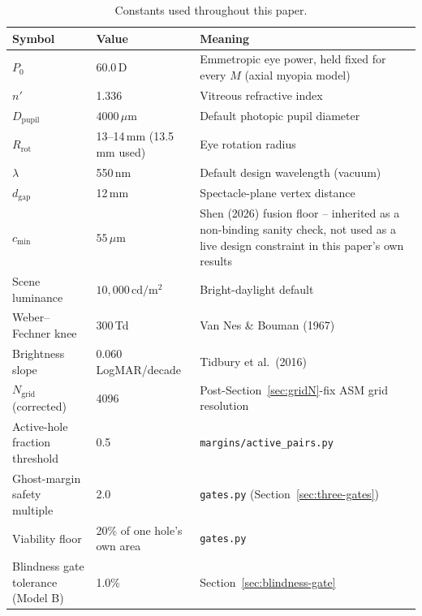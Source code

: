 \begin{longtable}{p{3.6cm}p{2.6cm}p{6.8cm}}
\caption{Constants used throughout this paper.}\\
\toprule
Symbol & Value & Meaning \\
\midrule
\endhead
$P_0$ & 60.0\,D & Emmetropic eye power, held fixed for every $M$ (axial myopia model) \\
$n'$ & 1.336 & Vitreous refractive index \\
$D_{\mathrm{pupil}}$ & $4000\,\mu$m & Default photopic pupil diameter \\
$R_{\mathrm{rot}}$ & 13--14\,mm (13.5\,mm used) & Eye rotation radius \\
$\lambda$ & 550\,nm & Default design wavelength (vacuum) \\
$d_{\mathrm{gap}}$ & 12\,mm & Spectacle-plane vertex distance \\
$c_{\min}$ & $55\,\mu$m & Shen (2026) fusion floor -- inherited as a non-binding
sanity check, not used as a live design constraint in this paper's own results \\
Scene luminance & $10{,}000\,\mathrm{cd/m^2}$ & Bright-daylight default \\
Weber--Fechner knee & 300\,Td & Van Nes \& Bouman (1967) \\
Brightness slope & 0.060\,LogMAR/decade & Tidbury et al.\ (2016) \\
$N_{\mathrm{grid}}$ (corrected) & 4096 & Post-Section~\ref{sec:gridN}-fix ASM grid resolution \\
Active-hole fraction threshold & 0.5 & \texttt{margins/active\_pairs.py} \\
Ghost-margin safety multiple & 2.0 & \texttt{gates.py} (Section~\ref{sec:three-gates}) \\
Viability floor & 20\% of one hole's own area & \texttt{gates.py} \\
Blindness gate tolerance (Model B) & 1.0\% & Section~\ref{sec:blindness-gate} \\
\bottomrule
\end{longtable}
